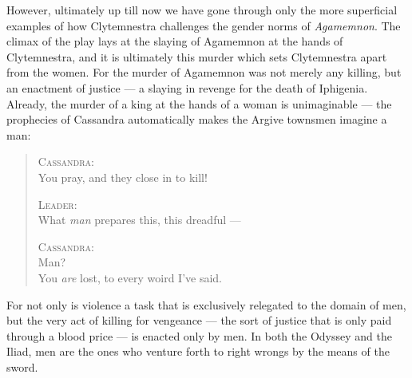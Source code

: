 However, ultimately up till now we have gone through only the more superficial
examples of how Clytemnestra challenges the gender norms of \emph{Agamemnon}.
The climax of the play lays at the slaying of Agamemnon at the hands of
Clytemnestra, and it is ultimately this murder which sets Clytemnestra apart
from the women. For the murder of Agamemnon was not merely any killing, but an
enactment of justice --- a slaying in revenge for the death of Iphigenia.
Already, the murder of a king at the hands of a woman is unimaginable --- the
prophecies of Cassandra automatically makes the Argive townsmen imagine a man:

\begin{quote}
  \textsc{Cassandra}: \\
  You pray, and they close in to kill!

  \textsc{Leader}: \\
  What \emph{man} prepares this, this dreadful ---

  \textsc{Cassandra}: \\
  Man? \\
  You \emph{are} lost, to every woird I've said.
\end{quote}

\noindent
For not only is violence a task that is exclusively relegated to the domain of
men, but the very act of killing for vengeance --- the sort of justice that is
only paid through a blood price --- is enacted only by men. In both the Odyssey
and the Iliad, men are the ones who venture forth to right wrongs by the means
of the sword.
